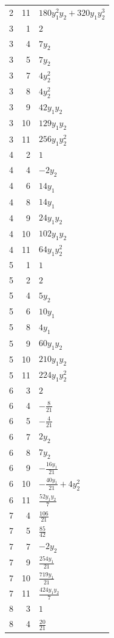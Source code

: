 \documentclass[10pt,a4paper]{article}
\begin{document}
{\begin{longtable}{rrp{125mm}}
2 & 11 & $180 y_{1}^{2} y_{2} + 320 y_{1} y_{2}^{3}$\\
3 & 1 & $2$\\
3 & 4 & $7 y_{2}$\\
3 & 5 & $7 y_{2}$\\
3 & 7 & $4 y_{2}^{2}$\\
3 & 8 & $4 y_{2}^{2}$\\
3 & 9 & $42 y_{1} y_{2}$\\
3 & 10 & $129 y_{1} y_{2}$\\
3 & 11 & $256 y_{1} y_{2}^{2}$\\
4 & 2 & $1$\\
4 & 4 & $- 2 y_{2}$\\
4 & 6 & $14 y_{1}$\\
4 & 8 & $14 y_{1}$\\
4 & 9 & $24 y_{1} y_{2}$\\
4 & 10 & $102 y_{1} y_{2}$\\
4 & 11 & $64 y_{1} y_{2}^{2}$\\
5 & 1 & $1$\\
5 & 2 & $2$\\
5 & 4 & $5 y_{2}$\\
5 & 6 & $10 y_{1}$\\
5 & 8 & $4 y_{1}$\\
5 & 9 & $60 y_{1} y_{2}$\\
5 & 10 & $210 y_{1} y_{2}$\\
5 & 11 & $224 y_{1} y_{2}^{2}$\\
6 & 3 & $2$\\
6 & 4 & $- \frac{8}{21}$\\
6 & 5 & $- \frac{4}{21}$\\
6 & 7 & $2 y_{2}$\\
6 & 8 & $7 y_{2}$\\
6 & 9 & $- \frac{16 y_{1}}{21}$\\
6 & 10 & $- \frac{40 y_{1}}{21} + 4 y_{2}^{2}$\\
6 & 11 & $\frac{52 y_{1} y_{2}}{7}$\\
7 & 4 & $\frac{106}{21}$\\
7 & 5 & $\frac{85}{42}$\\
7 & 7 & $- 2 y_{2}$\\
7 & 9 & $\frac{254 y_{1}}{21}$\\
7 & 10 & $\frac{719 y_{1}}{21}$\\
7 & 11 & $\frac{424 y_{1} y_{2}}{7}$\\
8 & 3 & $1$\\
8 & 4 & $\frac{20}{21}$\\

\end{longtable}}
\end{document}
